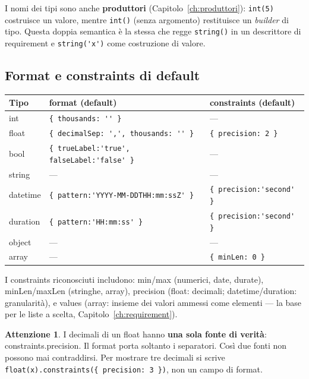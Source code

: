 \documentclass[11pt,a4paper]{book}
\let\code\lstinline
\newcommand{\ic}[1]{{\ttfamily #1}}
\theoremstyle{definition}
\newtheorem*{attenzione}{Attenzione}
\begin{document}
{{{{I nomi dei tipi sono anche \textbf{produttori} (Capitolo~\ref{ch:produttori}):
\code|int(5)| costruisce un valore, mentre \code|int()| (senza argomento)
restituisce un \emph{builder} di tipo. Questa doppia semantica è la stessa che
regge \code|string()| in un descrittore di requirement e \code|string('x')| come
costruzione di valore.

\subsection{Format e constraints di default}

\begin{center}
\small
\begin{tabular}{@{}l l l@{}}
\toprule
\textbf{Tipo} & \textbf{\ic{format} (default)} & \textbf{\ic{constraints} (default)} \\
\midrule
\ic{int} & \verb|{ thousands: '' }| & --- \\
\ic{float} & \verb|{ decimalSep: ',', thousands: '' }| & \verb|{ precision: 2 }| \\
\ic{bool} & \verb|{ trueLabel:'true', falseLabel:'false' }| & --- \\
\ic{string} & --- & --- \\
\ic{datetime} & \verb|{ pattern:'YYYY-MM-DDTHH:mm:ssZ' }| & \verb|{ precision:'second' }| \\
\ic{duration} & \verb|{ pattern:'HH:mm:ss' }| & \verb|{ precision:'second' }| \\
\ic{object} & --- & --- \\
\ic{array} & --- & \verb|{ minLen: 0 }| \\
\bottomrule
\end{tabular}
\end{center}

I \ic{constraints} riconosciuti includono: \ic{min}/\ic{max} (numerici, date,
durate), \ic{minLen}/\ic{maxLen} (stringhe, array), \ic{precision} (float:
decimali; datetime/duration: granularità), e \ic{values} (array: insieme dei
valori ammessi come elementi --- la base per le liste a scelta,
Capitolo~\ref{ch:requirement}).

\begin{attenzione}
I decimali di un \ic{float} hanno \textbf{una sola fonte di verità}:
\ic{constraints.precision}. Il \ic{format} porta soltanto i separatori. Così due
fonti non possono mai contraddirsi. Per mostrare tre decimali si scrive
\code|float(x).constraints({ precision: 3 })|, non un campo di \ic{format}.
\end{attenzione}

}}}}
\end{document}

